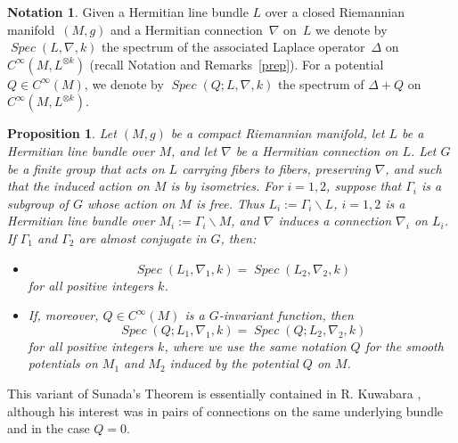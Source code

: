 \documentclass[12pt,leqno]{amsart}%
\newtheorem{prop}[theorem]{Proposition}
\theoremstyle{definition}
\newtheorem{nota}[theorem]{Notation}
\theoremstyle{remark}
\numberwithin{equation}{section}
\def\G{{\Gamma}}
\def\bs{{\backslash}}
\def\Spec{\operatorname{\textit{Spec}}}
\begin{document}
\begin{nota}
Given a Hermitian line bundle $L$ over a closed Riemannian manifold~$(M,g)$
and a Hermitian connection~$\nabla$ on~$L$ we denote by $\Spec(L,\nabla,k)$
the spectrum of the associated Laplace operator~$\Delta$
on $C^\infty(M, L^{\otimes k})$ (recall Notation and Remarks~\ref{prep}).
For a potential $Q\in C^\infty(M)$, we denote by $\Spec(Q;L,\nabla,k)$
the spectrum of $\Delta+Q$ on $C^\infty(M, L^{\otimes k})$.
\end{nota}

\begin{prop}
\label{mt}  Let $(M,g)$ be a compact Riemannian manifold, let $L$ be a Hermitian
line bundle over $M$, and let ${\nabla}$ be a Hermitian connection on $L$. Let
$G$ be a finite group that acts on $L$ carrying fibers to fibers, preserving
$\nabla$, and such that the induced action on $M$ is by isometries. For $i=1,2$,
suppose that ${\Gamma}_{i}$ is a subgroup of $G$ whose action on $M$ is free.
Thus $L_{i}:={\Gamma}_{i}{\backslash} L$, $i=1,2$ is a Hermitian line bundle
over $M_{i} :={{\Gamma}_{i}{\backslash} M}$, and $\nabla$ induces a connection
${\nabla}_{i}$ on $L_i$. If\/ ${\Gamma}_{1}$ and ${\Gamma}_{2}$ are almost
conjugate in $G$, then{\rm:}
\begin{itemize}
\item[(i)]
\[
{\Spec}(L_{1},\nabla_{1},k)={\Spec}(L_{2},\nabla_{2},k)
\]
for all positive integers $k$.

\item[(ii)]
If, moreover, $Q\in C^{\infty}(M)$ is a $G$-invariant function,  then
\[
{\Spec}(Q; L_{1},\nabla_{1},k)={\Spec}(Q; L_{2},\nabla_{2},k)
\]
for all positive integers $k$, where we use the same notation $Q$ for the smooth
potentials on $M_{1}$ and $M_{2}$ induced by the potential $Q$ on $M$.
\end{itemize}
\end{prop}

This variant of Sunada's Theorem is essentially contained in R. Kuwabara
\cite{Ku90}, although his interest was in pairs of connections on the same
underlying  bundle and in the case $Q=0$.
\end{document}
